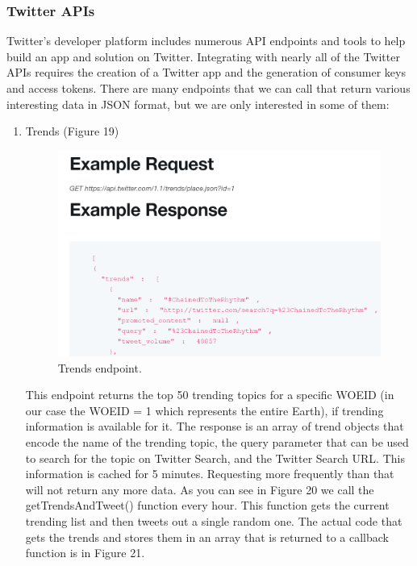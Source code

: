 \documentclass[12pt]{article} %
\begin{document}
	\subsubsection{Twitter APIs  \cite{twitterAPI}}
	\noindent Twitter’s developer platform includes numerous API endpoints and tools to help build an app and solution on Twitter.
	Integrating with nearly all of the Twitter APIs requires the creation of a Twitter app and the generation of consumer keys and access tokens.
	There are many endpoints that we can call that return various interesting data in JSON format, but we are only interested in some of them:

	\begin{enumerate}
	
		\item Trends (Figure 19)

		\begin{figure}[H] %
		\includegraphics[width=1\linewidth]{images/trendsAPIv2}
		\caption{Trends endpoint.}
		\label{trendsAPIv2}
		\end{figure}

		This endpoint returns the top 50 trending topics for a specific WOEID \cite{woeid} (in our case the WOEID = 1 which represents the entire Earth), if trending information is 				available for it.
		The response is an array of trend objects that encode the name of the trending topic, the query parameter that can be used to search for the topic on Twitter Search, and 				the Twitter Search URL. This information is cached for 5 minutes. Requesting more frequently than that will not return any more data. As you can see in Figure 20 we call the 			getTrendsAndTweet() function every hour. This function gets the current trending list and then tweets out a single random one. The actual code that gets the trends and 				stores them in an array that is returned to a callback function is in Figure 21.


\end{enumerate}
\end{document}

